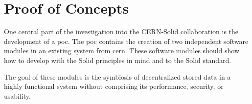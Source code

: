 \section{Proof of Concepts}

One central part of the investigation into the CERN-Solid collaboration is the development of a \gls{poc}. The \gls{poc} contains the creation of two independent software modules in an existing system from \gls{cern}. These software modules should show how to develop with the Solid principles in mind and to the Solid standard.

The goal of these modules is the symbiosis of decentralized stored data in a highly functional system without comprising its performance, security, or usability.


\newpage

\newpage

